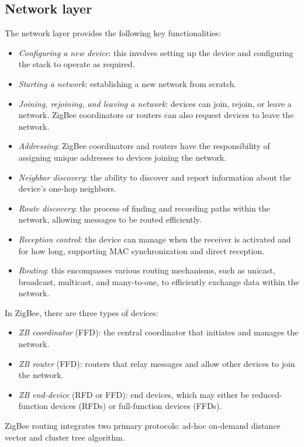 \subsection{Network layer}
The network layer provides the following key functionalities:
\begin{itemize}
    \item \textit{Configuring a new device}: this involves setting up the device and configuring the stack to operate as required.
    \item \textit{Starting a network}: establishing a new network from scratch.
    \item \textit{Joining, rejoining, and leaving a network}: devices can join, rejoin, or leave a network. ZigBee coordinators or routers can also request devices to leave the network.
    \item \textit{Addressing}: ZigBee coordinators and routers have the responsibility of assigning unique addresses to devices joining the network.
    \item \textit{Neighbor discovery}: the ability to discover and report information about the device's one-hop neighbors.
    \item \textit{Route discovery}: the process of finding and recording paths within the network, allowing messages to be routed efficiently.
    \item \textit{Reception control}: the device can manage when the receiver is activated and for how long, supporting MAC synchronization and direct reception.
    \item \textit{Routing}: this encompasses various routing mechanisms, such as unicast, broadcast, multicast, and many-to-one, to efficiently exchange data within the network.
\end{itemize}
\noindent In ZigBee, there are three types of devices:
\begin{itemize}
    \item \textit{ZB coordinator} (FFD): the central coordinator that initiates and manages the network.
    \item \textit{ZB router} (FFD): routers that relay messages and allow other devices to join the network.
    \item \textit{ZB end-device} (RFD or FFD): end devices, which may either be reduced-function devices (RFDs) or full-function devices (FFDs).
\end{itemize}
\noindent ZigBee routing integrates two primary protocols: ad-hoc on-demand distance vector and cluster tree algorithm. 


